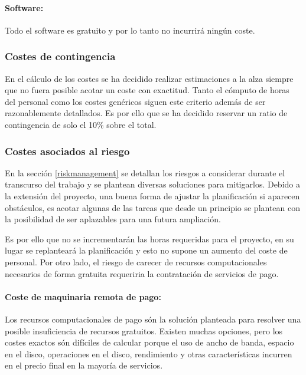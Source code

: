 \paragraph{Software:} Todo el software es gratuito y por lo tanto no incurrirá ningún coste.

\subsubsection{Costes de contingencia}
En el cálculo de los costes se ha decidido realizar estimaciones a la alza siempre que no fuera posible acotar
un coste con exactitud. Tanto el cómputo de horas del personal como los costes genéricos siguen este
criterio además de ser razonablemente detallados.
Es por ello que se ha decidido reservar un ratio de contingencia de solo el 10\% sobre el total.

\subsubsection{Costes asociados al riesgo}
En la sección \ref{riskmanagement} se detallan los riesgos a considerar durante el transcurso del trabajo y se plantean
diversas soluciones para mitigarlos. Debido a la extensión del proyecto, una buena forma de ajustar la planificación
si aparecen obstáculos, es acotar algunas de las tareas que desde un principio se plantean con la posibilidad de 
ser aplazables para una futura ampliación.

Es por ello que no se incrementarán las horas requeridas para el proyecto, en su lugar se
replanteará la planificación y esto no supone un aumento del coste de personal.
Por otro lado, el riesgo de carecer de recursos computacionales necesarios de forma gratuita requeriria la contratación
de servicios de pago.

\paragraph{Coste de maquinaria remota de pago:}\label{maquinariardepago}
Los recursos computacionales de pago són la solución planteada para resolver una posible insuficiencia de recursos
gratuitos.
Existen muchas opciones, pero los costes exactos són difíciles de calcular porque el uso de ancho de banda,
espacio en el disco, operaciones en el disco, rendimiento y otras características incurren en el precio final en la mayoría
de servicios.

